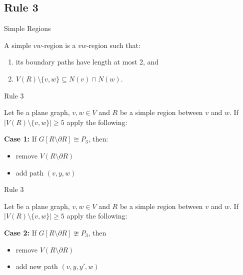 \subsection{Rule 3}
\begin{frame}[c]{Simple Regions}

    \begin{tcolorbox}[colback=TUMBlueLighter,title=Simple Region {\cite{Garnero2018}}]
        A simple $vw$-region is a $vw$-region such that:
        \begin{enumerate}
            \item its boundary paths have length at most 2, and
            \item $V(R) \setminus \{v,w\} \subseteq N(v) \cap N(w)$.
        \end{enumerate}
    \end{tcolorbox}

    \pause\begin{figure}[!ht]
    \end{figure}

\end{frame}


\begin{frame}[c]{Rule 3}

Let \G be a plane graph, $v, w \in V$ and $R$ be a simple region between $v$ and $w$. If $|V(R) \setminus \{v, w\}| \geq 5$ apply the following:

        \textbf{Case 1:} If $G[R\setminus\partial R] \cong P_3$, then:
            \begin{itemize}
                    \item remove $V(R\setminus\partial R)$
                    \item add path $(v,y,w)$
            \end{itemize}

    \begin{figure}[!ht]
    \pause{}
    \end{figure}
\end{frame}

\begin{frame}[c]{Rule 3}

    Let \G be a plane graph, $v, w \in V$ and $R$ be a simple region between $v$ and $w$. If $|V(R) \setminus \{v, w\}| \geq 5$ apply the following:

        \textbf{Case 2: }If $G[R\setminus\partial R] \ncong P_3$, then
            \begin{itemize}
                    \item remove $V(R\setminus\partial R)$
                    \item add new path $(v,y,y',w)$
            \end{itemize}

    \begin{figure}[!ht]
    \pause{}
    \end{figure}
\end{frame}


